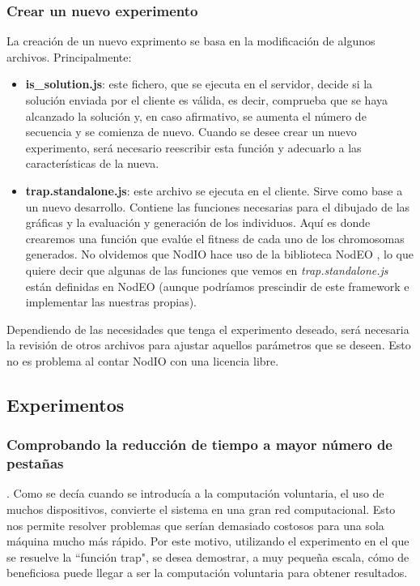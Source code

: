 \documentclass[runningheads,a4paper]{llncs}
\begin{document}
\subsubsection{Crear un nuevo experimento}
La creaci\'on de un nuevo exprimento se basa en la modificaci\'on de algunos archivos.
Principalmente:
\begin{itemize}
  \item \textbf{is\_solution.js}: este fichero, que se ejecuta en el servidor,
  decide si la soluci\'on enviada por el cliente es v\'alida, es decir,
  comprueba que se haya alcanzado la soluci\'on y, en caso afirmativo, se
  aumenta el n\'umero de secuencia y se comienza de nuevo. Cuando se desee
  crear un nuevo experimento, será necesario reescribir esta funci\'on y
  adecuarlo a las caracter\'isticas de la nueva.
  \item \textbf{trap.standalone.js}: este archivo se ejecuta en el cliente.
  Sirve como base a un nuevo desarrollo. Contiene las funciones necesarias para
  el dibujado de las gr\'aficas y la evaluaci\'on y generaci\'on de los individuos.
  Aqu\'i es donde crearemos una funci\'on que eval\'ue el fitness de cada uno de
  los chromosomas generados. No olvidemos que NodIO hace uso de la biblioteca
  NodEO \cite{nodeo}, lo que quiere decir que algunas de las funciones que vemos en
  \textit{trap.standalone.js} est\'an definidas en NodEO (aunque podr\'iamos prescindir
  de este framework e implementar las nuestras propias).
\end{itemize}

Dependiendo de las necesidades que tenga el experimento deseado, ser\'a necesaria
la revisi\'on de otros archivos para ajustar aquellos par\'ametros que se deseen.
Esto no es problema al contar NodIO con una licencia libre.

\subsection{Experimentos}

\subsubsection{Comprobando la reducci\'on de tiempo a mayor n\'umero de pesta\~nas}.
Como se dec\'ia cuando se introduc\'ia a la computaci\'on voluntaria,
el uso de muchos dispositivos, convierte el sistema en una gran red computacional.
Esto nos permite resolver problemas que ser\'ian demasiado costosos para una sola
m\'aquina mucho m\'as r\'apido. Por este motivo, utilizando el experimento
en el que se resuelve la ``funci\'on trap", se desea
demostrar, a muy peque\~na escala, c\'omo de beneficiosa puede llegar a ser la computaci\'on
voluntaria para obtener resultados.
\end{document}
